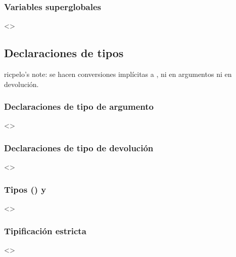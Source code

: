 \documentclass[a4paper,12pt,spanish]{sphinxmanual}
\begin{document}
\subsubsection{Variables superglobales}
\label{\detokenize{php:variables-superglobales}}
\textless{}\textgreater{}


\subsection{Declaraciones de tipos}
\label{\detokenize{php:declaraciones-de-tipos}}
ricpelo’s note:  se hacen conversiones implícitas a , ni
en argumentos ni en devolución.


\subsubsection{Declaraciones de tipo de argumento}
\label{\detokenize{php:declaraciones-de-tipo-de-argumento}}
\textless{}\textgreater{}


\subsubsection{Declaraciones de tipo de devolución}
\label{\detokenize{php:declaraciones-de-tipo-de-devolucion}}
\textless{}\textgreater{}


\subsubsection{Tipos  () y }
\label{\detokenize{php:tipos-nullable-y-void}}
\textless{}\textgreater{}


\subsubsection{Tipificación estricta}
\label{\detokenize{php:tipificacion-estricta}}
\textless{}\textgreater{}
\end{document}
